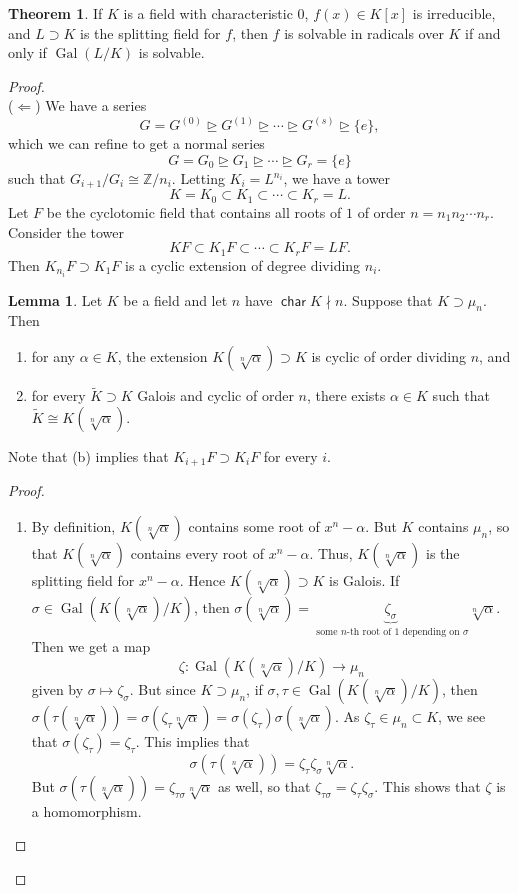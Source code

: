 \documentclass[10pt,letterpaper,cm]{nupset}
\theoremstyle{definition}
\theoremstyle{theorem}
\newtheorem{theorem}[definition]{Theorem}
\newtheorem{lemma}[definition]{Lemma}
\theoremstyle{remark}
\newcommand{\Z}{\mathbb Z}
\newcommand{\1}{\mathbf{1}}
\newcommand{\0}{\vec 0}
\DeclareMathOperator{\Char}{\mathsf{char}}
\DeclareMathOperator{\gal}{Gal}
\begin{document}
\begin{theorem}
If $K$ is a field with characteristic $0$, $f(x) \in K[x]$ is irreducible, and $L \supset K$ is the splitting field for $f$, then  $f$ is solvable in radicals over $K$ if and only if $\gal(L/K)$ is solvable. 
\end{theorem}
\begin{proof} $ $
\\
($\Longleftarrow$) We have a series $$ G = G^{(0)} \unrhd G^{(1)} \unrhd \cdots \unrhd G^{(s)} \unrhd \{e\} ,$$ which we can refine to get a normal series $$  G=G_0 \unrhd G_1 \unrhd \cdots \unrhd G_r = \{e\}  $$ such that $G_{i+1}/G_i \cong \Z/n_i$. Letting $K_i = L^{n_i}$, we have a tower $$ K= K_0 \subset K_1 \subset \cdots \subset K_r = L  .$$ Let $F$ be the cyclotomic field that contains all roots of $1$ of order $n= n_1n_2 \cdots n_r$. Consider the tower $$KF \subset K_1F \subset \cdots \subset K_r F = LF.$$  Then $K_{n_i}F \supset K_1F$ is a cyclic extension of degree dividing $n_i$.
\begin{lemma}
Let $K$ be a field and let $n$ have $\Char{K} \nmid n$. Suppose that $K \supset \mu_n$. Then
\begin{enumerate}[label=(\alph*)]
\item for any $\alpha \in K$, the extension $K(\sqrt[n]{\alpha}) \supset K$  is cyclic of order dividing $n$, and
\item for every $\widetilde{K} \supset K$ Galois and cyclic of order $n$, there exists $\alpha \in K$ such that $\widetilde{K} \cong K(\sqrt[n]{\alpha})$.
\end{enumerate}
Note that (b) implies that $K_{i+1}F \supset K_iF$ for every $i$.
\end{lemma}
\begin{proof} $ $
\begin{enumerate}[label=(\alph*)]
\item By definition, $K(\sqrt[n]{\alpha})$ contains some root of $x^n - \alpha$. But $K$ contains $\mu_n$, so that $K(\sqrt[n]{\alpha})$ contains every root of $x^n - \alpha$. Thus, $K(\sqrt[n]{\alpha})$ is the splitting field for $x^n - \alpha$. Hence $K(\sqrt[n]{\alpha}) \supset K$ is Galois.
 If $\sigma \in \gal(K(\sqrt[n]{\alpha}) / K)$, then $ \sigma(\sqrt[n]{\alpha}) = \underbrace{\zeta_{\sigma}}_{\text{ some } n\text{-th root of 1 depending on } \sigma} \sqrt[n]{\alpha}$. Then we get a map $$\zeta : \gal(K(\sqrt[n]{\alpha})/K) \to \mu_n$$ given by $ \sigma \mapsto \zeta_{\sigma}$. But since $K \supset \mu_n$, if $\sigma, \tau \in \gal(K(\sqrt[n]{\alpha})/K)$, then $\sigma(\tau(\sqrt[n]{\alpha})) = \sigma(\zeta_{\tau}\sqrt[n]{\alpha})= \sigma(\zeta_{\tau})\sigma(\sqrt[n]{\alpha})$. As $\zeta_{\tau} \in \mu_n \subset K$, we see that $\sigma(\zeta_{\tau}) = \zeta_{\tau}$. This implies that $$ \sigma(\tau(\sqrt[n]{\alpha})) =  \zeta_{\tau}\zeta_{\sigma}\sqrt[n]{\alpha} .$$ But $\sigma(\tau(\sqrt[n]{\alpha})) = \zeta_{\tau \sigma}\sqrt[n]{\alpha}$ as well, so that $\zeta_{\tau \sigma} = \zeta_{\tau} \zeta_{\sigma}$. This shows that $\zeta$ is a homomorphism. 
 

\end{enumerate}
\end{proof}
\end{proof}
\end{document}
